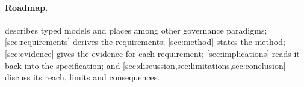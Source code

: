 \paragraph{Roadmap.}
 describes typed models and places \pol{} among other governance paradigms; \cref{sec:requirements} derives the requirements; \cref{sec:method} states the method; \cref{sec:evidence} gives the evidence for each requirement; \cref{sec:implications} reads it back into the specification; and \cref{sec:discussion,sec:limitations,sec:conclusion} discuss its reach, limits and consequences.
